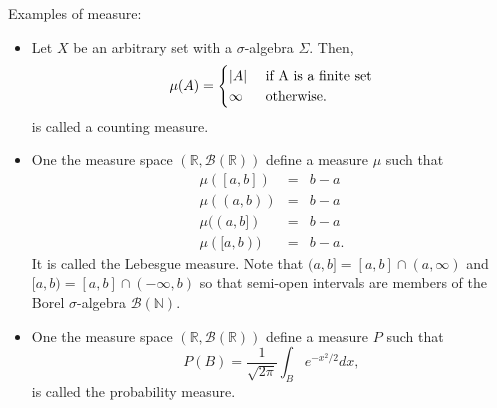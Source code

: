 \documentclass{article}
\newcommand{\sor}{\mathbb{R}}
\newcommand{\son}{\mathbb{N}}
\theoremstyle{plain}
\numberwithin{thm}{section}
\theoremstyle{plain}
\numberwithin{prop}{section}
\theoremstyle{definition}
\numberwithin{defn}{section}
\theoremstyle{remark}
\theoremstyle{plain}
\numberwithin{cor}{section}
\numberwithin{equation}{section}
\begin{document}
Examples of measure:
\begin{itemize}
\item Let $X$ be an arbitrary set with a $\sigma$-algebra $\Sigma$. Then,
\[
\mu(A) = \begin{cases} |A| & \text{ if } $A$ \text{ is a finite set} \\
\infty & \text{ otherwise.}
\end{cases}
\]
is called a counting measure.

\item One the measure space $(\sor, \mathcal{B}(\sor))$ define a 
measure $\mu$ such that
\begin{eqnarray*}
\mu([a, b]) &=& b - a \\
\mu((a, b)) &=& b - a \\
\mu((a, b]) &=& b - a \\
\mu([a, b)) &=& b - a.
\end{eqnarray*}
It is called the Lebesgue measure. Note that $(a, b] = [a, b] \cap (a, \infty)$
and $[a, b) = [a, b] \cap (-\infty, b)$ so that semi-open intervals are members
of the Borel $\sigma$-algebra $\mathcal{B}(\son)$.

\item One the measure space $(\sor, \mathcal{B}(\sor))$ define a 
measure $P$ such that
\[
P(B) = \frac{1}{\sqrt{2\pi}}\int_B e^{-x^2/2}dx,
\]
is called the probability measure.
\end{itemize}
\end{document}
